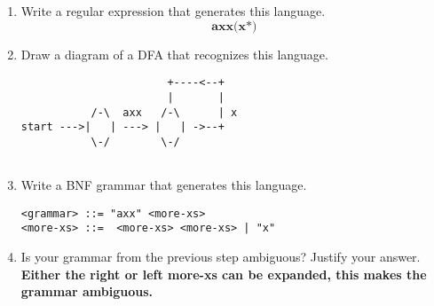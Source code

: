 \documentclass{article}
\begin{document}
\begin{enumerate}
\item Write a regular expression that generates this language.
\begin{equation}
\textbf{axx(x*)}
\end{equation}
\item Draw a diagram of a DFA that recognizes this language.
\begin{verbatim}
                       +----<--+
                       |       |
           /-\  axx   /-\      | x
start --->|   | ---> |   | ->--+
           \-/        \-/


\end{verbatim}
\item Write a BNF grammar that generates this language.
\begin{verbatim}
<grammar> ::= "axx" <more-xs>
<more-xs> ::=  <more-xs> <more-xs> | "x"
\end{verbatim}

\item Is your grammar from the previous step ambiguous? Justify your answer.\\
\vspace{1mm}
\textbf{Either the right or left more-xs can be expanded, this makes the grammar ambiguous.}
\end{enumerate}
\end{document}
